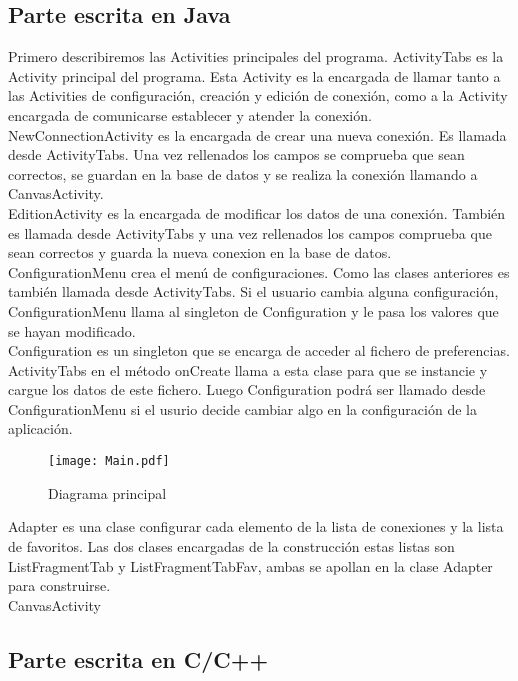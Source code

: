 \subsection{Parte escrita en Java}

Primero describiremos las Activities principales del programa. ActivityTabs es la Activity principal del programa. Esta Activity es la encargada de llamar tanto a las Activities de configuración, creación y edición de conexión, como a la Activity encargada de comunicarse establecer y atender la conexión.\\

NewConnectionActivity es la encargada de crear una nueva conexión. Es llamada desde ActivityTabs. Una vez rellenados los campos se comprueba que sean correctos, se guardan en la base de datos y se realiza la conexión llamando a CanvasActivity.\\

EditionActivity es la encargada de modificar los datos de una conexión. También es llamada desde ActivityTabs y una vez rellenados los campos comprueba que sean correctos y guarda la nueva conexion en la base de datos.\\

ConfigurationMenu crea el menú de configuraciones. Como las clases anteriores es también llamada desde ActivityTabs. Si el usuario cambia alguna configuración, ConfigurationMenu llama al singleton de Configuration y le pasa los valores que se hayan modificado.\\

Configuration es un singleton que se encarga de acceder al fichero de preferencias. ActivityTabs en el método onCreate llama a esta clase para que se instancie y cargue los datos de este fichero. Luego Configuration podrá ser llamado desde ConfigurationMenu si el usurio decide cambiar algo en la configuración de la aplicación.\\

\begin{figure}[h]
\begin{center}
\texttt{[image: Main.pdf]}
\end{center}
\caption{Diagrama principal}
\end{figure}

Adapter es una clase configurar cada elemento de la lista de conexiones y la lista de favoritos. Las dos clases encargadas de la construcción estas listas son ListFragmentTab y ListFragmentTabFav, ambas se apollan en la clase Adapter para construirse.\\

CanvasActivity\\

\subsection{Parte escrita en C/C++}


